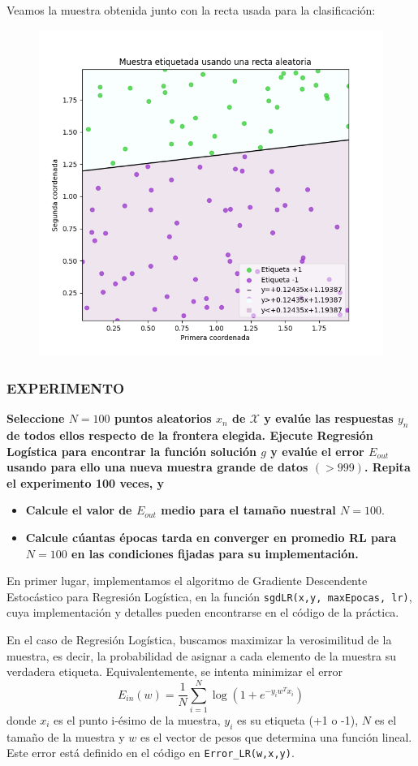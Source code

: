 \documentclass[a4]{article}
\begin{document}
Veamos la muestra obtenida junto con la recta usada para la clasificación:

\begin{figure}[H]
	\centering
	\includegraphics[width=0.6\linewidth]{img/RL1}
	\caption{}
	\label{fig:rl1}
\end{figure}



\subsubsection{EXPERIMENTO} 

\textbf{Seleccione $ N = 100 $ puntos aleatorios ${x_n } $ de  $ \mathcal{X} $ y evalúe las
respuestas $ {y_n } $ de todos ellos respecto de la frontera elegida. Ejecute Regresión
Logística para encontrar la función solución $ g $ y evalúe el
error $ E_{out} $ usando para ello una nueva muestra grande de datos $ (> 999) $. Repita el
experimento 100 veces, y}

\begin{itemize}
	\item \textbf{Calcule el valor de $ E_{out} $ medio para el tamaño nuestral $ N=100. $}
	\item \textbf{Calcule cúantas épocas tarda en converger en promedio RL para $ N=100 $ en las
	condiciones fijadas para su implementación.}
\end{itemize}


En primer lugar, implementamos el algoritmo de Gradiente Descendente Estocástico para Regresión Logística, en la función \lstinline|sgdLR(x,y, maxEpocas, lr)|, cuya implementación y detalles pueden encontrarse en el código de la práctica. 

En el caso de Regresión Logística, buscamos maximizar la verosimilitud de la muestra, es decir, la probabilidad de asignar a cada elemento de la muestra su verdadera etiqueta. Equivalentemente, se intenta minimizar el error
 $$E_{in}(w)=\frac{1}{N}\sum_{i=1}^{N}\log(1+e^{-y_iw^Tx_i})$$
donde $x_i$ es el punto i-ésimo de la muestra, $y_i$ es su etiqueta (+1 o -1), $ N $ es el tamaño de la muestra y $ w $ es el vector de pesos que determina una función lineal. Este error está definido en el código en \lstinline|Error_LR(w,x,y)|. 
\end{document}
